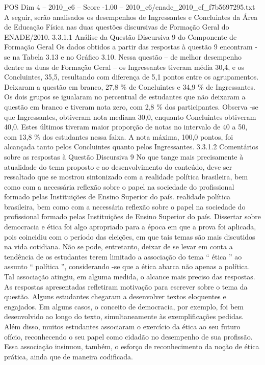 \begin{textsample}{POS Dim 4 – 2010\_c6 – Score -1.00 – 2010\_c6/enade\_2010\_ef\_f7b5697295.txt}
A seguir, serão analisados os desempenhos de Ingressantes e Concluintes da Área de Educação Física nas duas questões discursivas de Formação Geral do ENADE/2010. 3.3.1.1 Análise da Questão Discursiva 9 do Componente de Formação Geral Os dados obtidos a partir das respostas à questão 9 encontram -se na Tabela 3.13 e no Gráfico 3.10.
Nessa questão – de melhor desempenho dentre as duas de Formação Geral – os Ingressantes tiveram média 30,4, e os Concluintes, 35,5, resultando com diferença de 5,1 pontos entre os agrupamentos.
Deixaram a questão em branco, 27,8 \% de Concluintes e 34,9 \% de Ingressantes.
Os dois grupos se igualaram no percentual de estudantes que não deixaram a questão em branco e tiveram nota zero, com 2,8 \% dos participantes.
Observa -se que Ingressantes, obtiveram nota mediana 30,0, enquanto Concluintes obtiveram 40,0.
Estes últimos tiveram maior proporção de notas no intervalo de 40 a 50, com 13,8 \% dos estudantes nessa faixa.
A nota máxima, 100,0 pontos, foi alcançada tanto pelos Concluintes quanto pelos Ingressantes. 3.3.1.2 Comentários sobre as respostas à Questão Discursiva 9 No que tange mais precisamente à atualidade do tema proposto e ao desenvolvimento do conteúdo, deve ser ressaltado que se mostrou sintonizado com a realidade política brasileira, bem como com a necessária reflexão sobre o papel na sociedade do profissional formado pelas Instituições de Ensino Superior do país. realidade política brasileira, bem como com a necessária reflexão sobre o papel na sociedade do profissional formado pelas Instituições de Ensino Superior do país.
Dissertar sobre democracia e ética foi algo apropriado para a época em que a prova foi aplicada, pois coincidiu com o período das eleições, em que tais temas são mais discutidos na vida cotidiana.
Não se pode, entretanto, deixar de se levar em conta a tendência de os estudantes terem limitado a associação do tema “ ética ” ao assunto “ política ”, considerando -se que a ética abarca não apenas a política.
Tal associação atingiu, em alguma medida, o alcance mais preciso das respostas.
As respostas apresentadas refletiram motivação para escrever sobre o tema da questão.
Alguns estudantes chegaram a desenvolver textos eloquentes e engajados.
Em alguns casos, o conceito de democracia, por exemplo, foi bem desenvolvido ao longo do texto, simultaneamente às exemplificações pedidas.
Além disso, muitos estudantes associaram o exercício da ética ao seu futuro ofício, reconhecendo o seu papel como cidadão no desempenho de sua profissão.
Essa associação insinuou, também, o esforço de reconhecimento da noção de ética prática, ainda que de maneira codificada.

\end{textsample}
